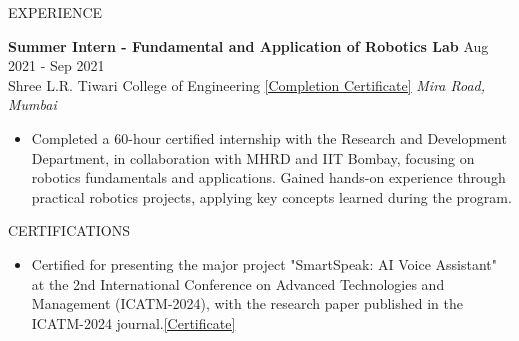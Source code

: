 \documentclass{resume} %
\begin{document}

\begin{rSection}{EXPERIENCE}

\textbf{Summer Intern - Fundamental and Application of Robotics Lab} \hfill Aug 2021 - Sep 2021\\
Shree L.R. Tiwari College of Engineering \href{https://drive.google.com/file/d/13E8hxdT5_Z6wY_oAUD6v-tK2hHk8x2a8/view?usp=sharing}{   [Completion Certificate]} \hfill \textit{Mira Road, Mumbai}
\begin{itemize}
    \item Completed a 60-hour certified internship with the Research and Development Department, in collaboration with MHRD and IIT Bombay, focusing on robotics fundamentals and applications. Gained hands-on experience through practical robotics projects, applying key concepts learned during the program.
\end{itemize}

\end{rSection}


\begin{rSection}{CERTIFICATIONS}
\begin{itemize}
    \item Certified for presenting the major project "SmartSpeak: AI Voice Assistant" at the 2nd International Conference on Advanced Technologies and Management (ICATM-2024), with the research paper published in the ICATM-2024 journal.\href{https://drive.google.com/file/d/1WaL93tJuPJN1cGxox7ekrVcnih9mXzwu/view?usp=sharing}{[Certificate]}
    
\end{itemize}

\end{rSection}


\end{document}
